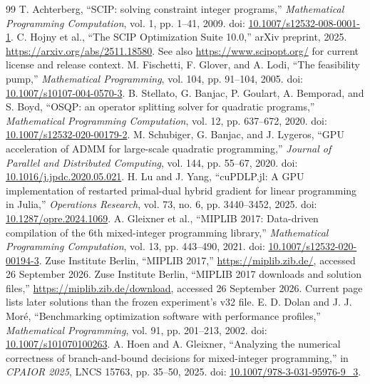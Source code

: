 \documentclass[10pt,a4paper,twocolumn]{article}
\begin{document}
\begin{thebibliography}{99}
 T. Achterberg, ``SCIP: solving constraint integer programs,'' \emph{Mathematical Programming Computation}, vol. 1, pp. 1--41, 2009. doi: \href{https://doi.org/10.1007/s12532-008-0001-1}{10.1007/s12532-008-0001-1}.
 C. Hojny et al., ``The SCIP Optimization Suite 10.0,'' arXiv preprint, 2025. \url{https://arxiv.org/abs/2511.18580}. See also \url{https://www.scipopt.org/} for current license and release context.
 M. Fischetti, F. Glover, and A. Lodi, ``The feasibility pump,'' \emph{Mathematical Programming}, vol. 104, pp. 91--104, 2005. doi: \href{https://doi.org/10.1007/s10107-004-0570-3}{10.1007/s10107-004-0570-3}.
 B. Stellato, G. Banjac, P. Goulart, A. Bemporad, and S. Boyd, ``OSQP: an operator splitting solver for quadratic programs,'' \emph{Mathematical Programming Computation}, vol. 12, pp. 637--672, 2020. doi: \href{https://doi.org/10.1007/s12532-020-00179-2}{10.1007/s12532-020-00179-2}.
 M. Schubiger, G. Banjac, and J. Lygeros, ``GPU acceleration of ADMM for large-scale quadratic programming,'' \emph{Journal of Parallel and Distributed Computing}, vol. 144, pp. 55--67, 2020. doi: \href{https://doi.org/10.1016/j.jpdc.2020.05.021}{10.1016/j.jpdc.2020.05.021}.
 H. Lu and J. Yang, ``cuPDLP.jl: A GPU implementation of restarted primal-dual hybrid gradient for linear programming in Julia,'' \emph{Operations Research}, vol. 73, no. 6, pp. 3440--3452, 2025. doi: \href{https://doi.org/10.1287/opre.2024.1069}{10.1287/opre.2024.1069}.
 A. Gleixner et al., ``MIPLIB 2017: Data-driven compilation of the 6th mixed-integer programming library,'' \emph{Mathematical Programming Computation}, vol. 13, pp. 443--490, 2021. doi: \href{https://doi.org/10.1007/s12532-020-00194-3}{10.1007/s12532-020-00194-3}.
 Zuse Institute Berlin, ``MIPLIB 2017,'' \url{https://miplib.zib.de/}, accessed 26 September 2026.
 Zuse Institute Berlin, ``MIPLIB 2017 downloads and solution files,'' \url{https://miplib.zib.de/download}, accessed 26 September 2026. Current page lists later solutions than the frozen experiment's v32 file.
 E. D. Dolan and J. J. Mor\'e, ``Benchmarking optimization software with performance profiles,'' \emph{Mathematical Programming}, vol. 91, pp. 201--213, 2002. doi: \href{https://doi.org/10.1007/s101070100263}{10.1007/s101070100263}.
 A. Hoen and A. Gleixner, ``Analyzing the numerical correctness of branch-and-bound decisions for mixed-integer programming,'' in \emph{CPAIOR 2025}, LNCS 15763, pp. 35--50, 2025. doi: \href{https://doi.org/10.1007/978-3-031-95976-9_3}{10.1007/978-3-031-95976-9\_3}.

\end{thebibliography}
\end{document}
